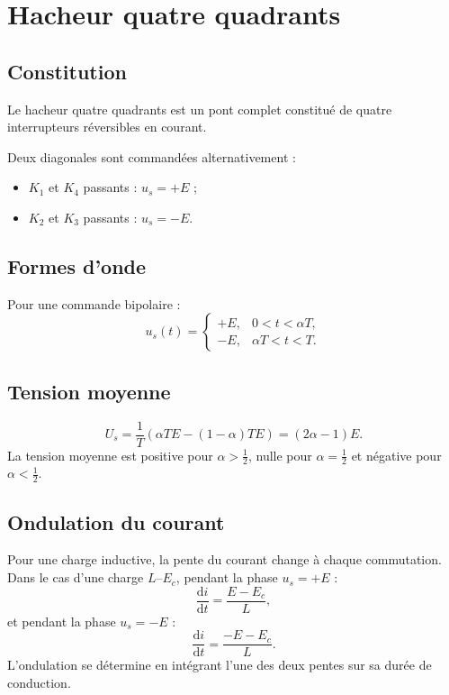 \section{Hacheur quatre quadrants}

\subsection{Constitution}
Le hacheur quatre quadrants est un pont complet constitué de quatre interrupteurs réversibles en courant.

\begin{center}\TLHacheurQuatreQuadrants\end{center}

Deux diagonales sont commandées alternativement :
\begin{itemize}
\item $K_1$ et $K_4$ passants : $u_s=+E$ ;
\item $K_2$ et $K_3$ passants : $u_s=-E$.
\end{itemize}

\subsection{Formes d'onde}
Pour une commande bipolaire :
\[
u_s(t)=
\begin{cases}
+E,&0<t<\alpha T,\\
-E,&\alpha T<t<T.
\end{cases}
\]

\begin{center}
\end{center}

\subsection{Tension moyenne}
\[
U_s=\frac1T\left(\alpha TE-(1-\alpha)TE\right)
=\boxed{(2\alpha-1)E}.
\]
La tension moyenne est positive pour $\alpha>\tfrac12$, nulle pour $\alpha=\tfrac12$ et négative pour $\alpha<\tfrac12$.

\subsection{Ondulation du courant}
Pour une charge inductive, la pente du courant change à chaque commutation. Dans le cas d'une charge $L$--$E_c$, pendant la phase $u_s=+E$ :
\[
\frac{\mathrm di}{\mathrm dt}=\frac{E-E_c}{L},
\]
et pendant la phase $u_s=-E$ :
\[
\frac{\mathrm di}{\mathrm dt}=\frac{-E-E_c}{L}.
\]
L'ondulation se détermine en intégrant l'une des deux pentes sur sa durée de conduction.


